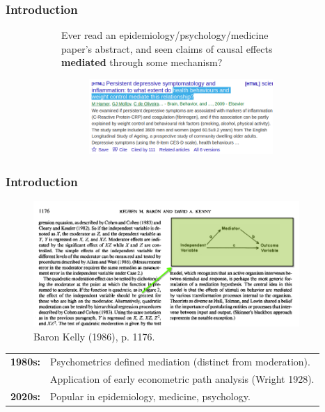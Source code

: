 \documentclass[dvipsnames]{beamer} %
\begin{document}
\begin{frame}[noframenumbering]
    \frametitle{Introduction}
    \begin{figure}[h!]
        \centering
        \singlespacing
        \begin{subfigure}[c]{\textwidth}
            Ever read an epidemiology/psychology/medicine paper's abstract, and seen claims of causal effects \textbf{mediated} through some mechanism?
        \end{subfigure}
        \begin{subfigure}[c]{0.75\textwidth}
            \centering
            \singlespacing
            \begin{subfigure}[c]{\textwidth}
                \centering
                \includegraphics[width=\textwidth]{presentation-files/headlines/hamer-2009.png}
            \end{subfigure}
        \end{subfigure}
    \end{figure}
\end{frame}
\begin{frame}[noframenumbering]
    \frametitle{Introduction}
    \vskip-0.5cm
    \begin{figure}
        \centering
        \singlespacing
        \caption{Baron Kelly (1986), p. 1176.}
        \vskip-0.25cm
        \includegraphics[width=0.9\textwidth]{presentation-files/headlines/baronkelly-1986.png}
    \end{figure}
    \begin{tabular}{l l}
        \textbf{1980s:}
        & Psychometrics defined mediation (distinct from moderation). \\
        & Application of early econometric path analysis (Wright 1928). \\
        \textbf{2020s:}
        & Popular in epidemiology, medicine, psychology.
    \end{tabular}
\end{frame}
\end{document}
